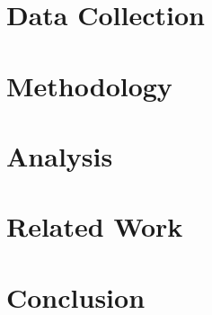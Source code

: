 \documentclass[10pt,twocolumn]{IEEEtran11}
\begin{document}
\section{Data Collection}
\label{sec:datacollection}


\section{Methodology}
\label{sec:methodology}


\section{Analysis}
\label{sec:analysis}


\section{Related Work}  
\label{sec:relatedwork}


\section{Conclusion}
\label{sec:conclusion}




\onecolumn
{}
\label{app:user-attributes}


\label{app:table_cross_attribute}


\begin{comment}
\section{Dataset Profile}

\end{comment}
\end{document}
